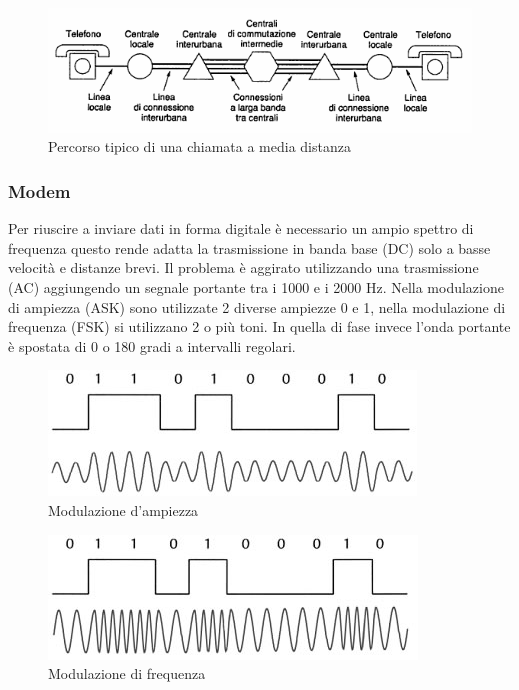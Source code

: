 \begin{figure}[htbp]
\centering
\includegraphics[scale=1]{images/phone.png}
\caption{Percorso tipico di una chiamata a media distanza}
\end{figure}

\subsubsection*{Modem}

Per riuscire a inviare dati in forma digitale è necessario un ampio spettro di frequenza questo rende adatta la trasmissione in banda base (DC) solo a basse velocità e distanze brevi. Il problema è aggirato utilizzando una trasmissione (AC) aggiungendo un segnale portante tra i 1000 e i 2000 Hz. Nella modulazione di ampiezza (ASK) sono utilizzate 2 diverse ampiezze 0 e 1, nella modulazione di frequenza (FSK) si utilizzano 2 o più toni. In quella di fase invece l'onda portante è spostata di 0 o 180 gradi a intervalli regolari.

\begin{figure}[htbp]
\centering
\includegraphics[scale=1]{images/modulazione_ask.jpg}
\caption{Modulazione d'ampiezza}
\end{figure}

\begin{figure}[htbp]
\centering
\includegraphics[scale=1]{images/modulazione_fsk.jpg}
\caption{Modulazione di frequenza}
\end{figure}

